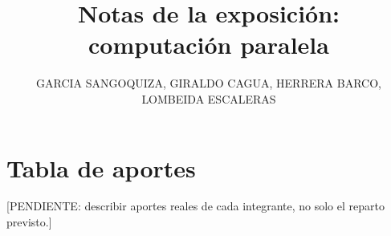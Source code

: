 \documentclass[11pt]{article}
\title{Notas de la exposición: computación paralela}
\author{GARCIA SANGOQUIZA, GIRALDO CAGUA, HERRERA BARCO, LOMBEIDA ESCALERAS}
\date{}
\begin{document}
\par
[DECLARACIÓN DE USO DE IA PENDIENTE: describir el uso real del equipo.]




\section*{Tabla de aportes}
[PENDIENTE: describir aportes reales de cada integrante, no solo el reparto previsto.]
\printbibliography
\end{document}
